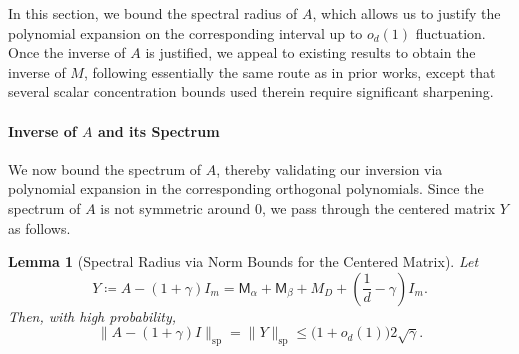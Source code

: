 \documentclass[12pt]{article}
\def \E {\mathbb{E}}
\def \al {\alpha}
\newtheorem{lemma}[theorem]{Lemma}
\newcommand{\poly}{\operatorname{poly}}
\newcommand{\gam}{\gamma}
\newcommand{\cm}{\mathsf{M} }
\begin{document}
In this section, we bound the spectral radius of $A$, which allows us to justify the polynomial expansion on the corresponding interval up to $o_d(1)$ fluctuation. Once the inverse of $A$ is justified, we appeal to existing results to obtain the inverse of $M$, following essentially the same route as in prior works, except that several scalar concentration bounds used therein require significant sharpening.
%
%
%
%

\paragraph{Inverse of $A$ and its Spectrum}
We now bound the spectrum of $A$, thereby validating our inversion via polynomial expansion in the corresponding orthogonal polynomials. Since the spectrum of $A$ is not symmetric around $0$, we pass through the centered matrix $Y$ as follows.
\begin{lemma}[Spectral Radius via Norm Bounds for the Centered Matrix]
Let
\[
    Y
    \coloneqq
    A-(1+\gamma)I_m
    =
    \cm_\alpha+\cm_\beta+M_D
    +
    \left(\frac1d-\gamma\right)I_m.
\]
Then, with high probability,
\[
    \|A-(1+\gamma)I\|_{\mathrm{sp}}
    =
    \|Y\|_{\mathrm{sp}} 
    \le
    \bigl(1+o_d(1)\bigr)2\sqrt{\gamma}.
\]
\end{lemma}
\end{document}
